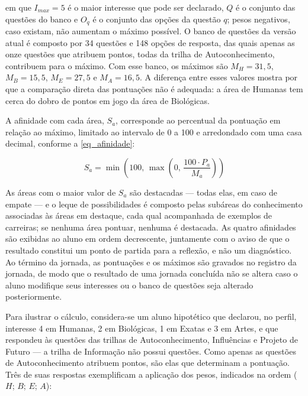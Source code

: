 \noindent em que $I_{max} = 5$ é o maior interesse que pode ser declarado, $Q$ é o conjunto das questões do banco e $O_q$ é o conjunto das opções da questão $q$; pesos negativos, caso existam, não aumentam o máximo possível. O banco de questões da versão atual é composto por 34 questões e 148 opções de resposta, das quais apenas as onze questões que atribuem pontos, todas da trilha de Autoconhecimento, contribuem para o máximo. Com esse banco, os máximos são $M_H = 31{,}5$, $M_B = 15{,}5$, $M_E = 27{,}5$ e $M_A = 16{,}5$. A diferença entre esses valores mostra por que a comparação direta das pontuações não é adequada: a área de Humanas tem cerca do dobro de pontos em jogo da área de Biológicas.

A afinidade com cada área, $S_a$, corresponde ao percentual da pontuação em relação ao máximo, limitado ao intervalo de 0 a 100 e arredondado com uma casa decimal, conforme a \autoref{eq_afinidade}:

\begin{equation}
S_a = \min\left(100,\, \max\left(0,\, \frac{100 \cdot P_a}{M_a}\right)\right)
\label{eq_afinidade}
\end{equation}

As áreas com o maior valor de $S_a$ são destacadas --- todas elas, em caso de empate --- e o leque de possibilidades é composto pelas subáreas do conhecimento associadas às áreas em destaque, cada qual acompanhada de exemplos de carreiras; se nenhuma área pontuar, nenhuma é destacada. As quatro afinidades são exibidas ao aluno em ordem decrescente, juntamente com o aviso de que o resultado constitui um ponto de partida para a reflexão, e não um diagnóstico. Ao término da jornada, as pontuações e os máximos são gravados no registro da jornada, de modo que o resultado de uma jornada concluída não se altera caso o aluno modifique seus interesses ou o banco de questões seja alterado posteriormente.

Para ilustrar o cálculo, considera-se um aluno hipotético que declarou, no perfil, interesse 4 em Humanas, 2 em Biológicas, 1 em Exatas e 3 em Artes, e que respondeu às questões das trilhas de Autoconhecimento, Influências e Projeto de Futuro --- a trilha de Informação não possui questões. Como apenas as questões de Autoconhecimento atribuem pontos, são elas que determinam a pontuação. Três de suas respostas exemplificam a aplicação dos pesos, indicados na ordem ($H$; $B$; $E$; $A$):

